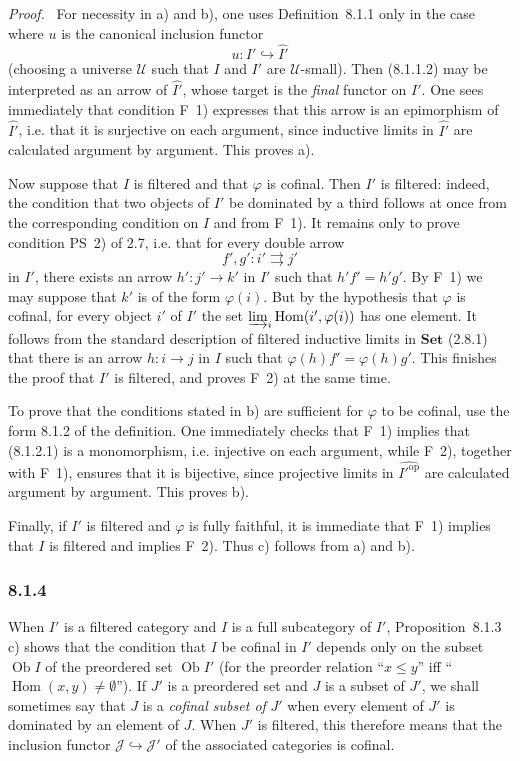 \documentclass[11pt]{article}
\newcommand{\U}{\mathcal{U}}
\newcommand{\Set}{\mathbf{Set}}
\newcommand{\Ob}{\operatorname{Ob}}
\newcommand{\Hom}{\operatorname{Hom}}
\newcommand{\op}{\mathrm{op}}
\newenvironment{proofsketch}{\par\noindent\emph{Proof.}\ }{\par\medskip}
\begin{document}
\begin{proofsketch}
For necessity in a) and b), one uses Definition~8.1.1 only in the case where $u$ is the canonical inclusion functor
\[
u:I'\hookrightarrow \widehat{I'}
\]
(choosing a universe $\U$ such that $I$ and $I'$ are $\U$-small). Then (8.1.1.2) may be interpreted as an arrow of $\widehat{I'}$, whose target is the \emph{final} functor on $I'$. One sees immediately that condition F~1) expresses that this arrow is an epimorphism of $\widehat{I'}$, i.e. that it is surjective on each argument, since inductive limits in $\widehat{I'}$ are calculated argument by argument. This proves a).

Now suppose that $I$ is filtered and that $\varphi$ is cofinal. Then $I'$ is filtered: indeed, the condition that two objects of $I'$ be dominated by a third follows at once from the corresponding condition on $I$ and from F~1). It remains only to prove condition PS~2) of 2.7, i.e. that for every double arrow
\[
f',g':i'\rightrightarrows j'
\]
in $I'$, there exists an arrow $h':j'\to k'$ in $I'$ such that $h'f'=h'g'$. By F~1) we may suppose that $k'$ is of the form $\varphi(i)$. But by the hypothesis that $\varphi$ is cofinal, for every object $i'$ of $I'$ the set $\varinjlim_i\Hom(i',\varphi(i))$ has one element. It follows from the standard description of filtered inductive limits in $\Set$ (2.8.1) that there is an arrow $h:i\to j$ in $I$ such that $\varphi(h)f'=\varphi(h)g'$. This finishes the proof that $I'$ is filtered, and proves F~2) at the same time.

To prove that the conditions stated in b) are sufficient for $\varphi$ to be cofinal, use the form 8.1.2 of the definition. One immediately checks that F~1) implies that (8.1.2.1) is a monomorphism, i.e. injective on each argument, while F~2), together with F~1), ensures that it is bijective, since projective limits in $\widehat{{I'}^{\op}}$ are calculated argument by argument. This proves b).

Finally, if $I'$ is filtered and $\varphi$ is fully faithful, it is immediate that F~1) implies that $I$ is filtered and implies F~2). Thus c) follows from a) and b).
\end{proofsketch}

\subsubsection*{8.1.4}
When $I'$ is a filtered category and $I$ is a full subcategory of $I'$, Proposition~8.1.3 c) shows that the condition that $I$ be cofinal in $I'$ depends only on the subset $\Ob I$ of the preordered set $\Ob I'$ (for the preorder relation ``$x\leq y$'' iff ``$\Hom(x,y)\neq\emptyset$''). If $J'$ is a preordered set and $J$ is a subset of $J'$, we shall sometimes say that $J$ is a \emph{cofinal subset of} $J'$ when every element of $J'$ is dominated by an element of $J$. When $J'$ is filtered, this therefore means that the inclusion functor $\mathcal J\hookrightarrow\mathcal J'$ of the associated categories is cofinal.
\end{document}
